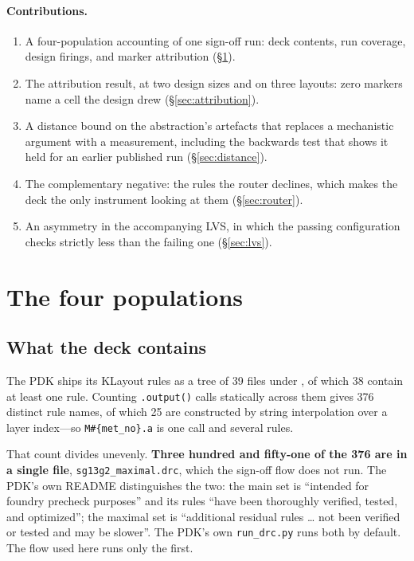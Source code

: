 \documentclass[11pt,a4paper]{article}
\newcommand{\file}[1]{\texttt{\small #1}}
\begin{document}
\paragraph{Contributions.}
\begin{enumerate}
\item A four-population accounting of one sign-off run: deck contents,
  run coverage, design firings, and marker attribution
  (\S\ref{sec:accounting}).
\item The attribution result, at two design sizes and on three layouts:
  zero markers name a cell the design drew (\S\ref{sec:attribution}).
\item A distance bound on the abstraction's artefacts that replaces a
  mechanistic argument with a measurement, including the backwards test
  that shows it held for an earlier published run (\S\ref{sec:distance}).
\item The complementary negative: the rules the router declines, which
  makes the deck the only instrument looking at them
  (\S\ref{sec:router}).
\item An asymmetry in the accompanying LVS, in which the passing
  configuration checks strictly less than the failing one
  (\S\ref{sec:lvs}).
\end{enumerate}

\section{The four populations}
\label{sec:accounting}

\subsection{What the deck contains}

The PDK ships its KLayout rules as a tree of \num{39} files under
{\small{}}, of which \num{38}
contain at least one rule. Counting \texttt{.output()} calls statically
across them gives \num{376} distinct rule names, of which \num{25} are
constructed by string interpolation over a layer index---so
\texttt{M\#\{met\_no\}.a} is one call and several rules.

That count divides unevenly. \textbf{Three hundred and fifty-one of the
\num{376} are in a single file}, \file{sg13g2\_maximal.drc}, which the
sign-off flow does not run. The PDK's own README distinguishes the two:
the main set is ``intended for foundry precheck purposes'' and its rules
``have been thoroughly verified, tested, and optimized''; the maximal set
is ``additional residual rules \ldots{} not been verified or tested and
may be slower''. The PDK's own \file{run\_drc.py} runs both by default.
The flow used here runs only the first.
\end{document}
